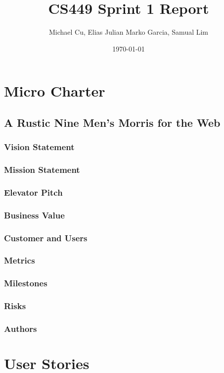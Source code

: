 \documentclass[11pt]{article}
\author{Michael Cu, Elias Julian Marko Garcia, Samual Lim}
\date{\today}
\title{CS449 Sprint 1 Report}
\begin{document}
\maketitle
\tableofcontents

\section{Micro Charter}
\label{sec:org5c92028}
\subsection{A Rustic Nine Men's Morris for the Web}
\label{sec:org63fd7a4}
\subsubsection*{Vision Statement}
\label{sec:org85ccb26}
\subsubsection*{Mission Statement}
\label{sec:orgbce4bef}
\subsubsection*{Elevator Pitch}
\label{sec:orgce8dbfe}
\subsubsection*{Business Value}
\label{sec:orgdc9bd4f}
\subsubsection*{Customer and Users}
\label{sec:orgaaab6a9}
\subsubsection*{Metrics}
\label{sec:org414961e}
\subsubsection*{Milestones}
\label{sec:orge4e5217}
\subsubsection*{Risks}
\label{sec:orgbf83c60}
\subsubsection*{Authors}
\label{sec:org88c3c24}
\section{User Stories}
\label{sec:orgc2a976e}
\end{document}
